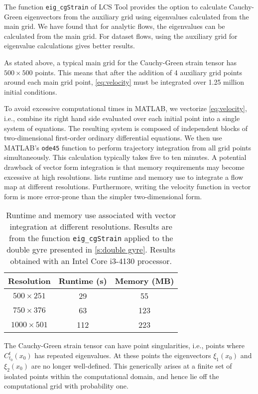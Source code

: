 \documentclass{article}
\begin{document}
The function \lstinline!eig_cgStrain! of LCS Tool provides the option to calculate Cauchy-Green eigenvectors from the auxiliary grid using eigenvalues calculated from the main grid.
We have found that for analytic flows, the eigenvalues can be calculated from the main grid.
For dataset flows, using the auxiliary grid for eigenvalue calculations gives better results.

As stated above, a typical main grid for the Cauchy-Green strain tensor has $500 \times 500$ points.
This means that after the addition of 4 auxiliary grid points around each main grid point, \cref{eq:velocity} must be integrated over 1.25 million initial conditions.

To avoid excessive computational times in MATLAB, we vectorize \cref{eq:velocity}, i.e., combine its right hand side evaluated over each initial point into a single system of equations. The resulting system is composed of independent blocks of two-dimensional first-order ordinary differential equations. We then use MATLAB's \lstinline!ode45! function to perform trajectory integration from all grid points simultaneously. This calculation typically takes five to ten minutes.
A potential drawback of vector form integration is that memory requirements may become excessive at high resolutions.
 lists runtime and memory use to integrate a flow map at different resolutions.
Furthermore, writing the velocity function in vector form is more error-prone than the simpler two-dimensional form.

\begin{table}
\begin{center}
\begin{tabular}{|c|c|c|}
\hline
Resolution & Runtime (s) & Memory (MB)\tabularnewline
\hline \hline
$500 \times 251$ & 29 & 55\tabularnewline
\hline
$750 \times 376$ & 63 & 123\tabularnewline
\hline
$1000 \times 501$ & 112 & 223\tabularnewline
\hline
\end{tabular}
\end{center}
\caption{
Runtime and memory use associated with vector integration at different resolutions.
Results are from the function \lstinline!eig_cgStrain! applied to the double gyre presented in \cref{s:double gyre}.
Results obtained with an Intel Core i3-4130 processor.
}
\label{t:vector integration memory}
\end{table}

The Cauchy-Green strain tensor can have point singularities, i.e., points where $C_{t_0}^t(x_0)$ has repeated eigenvalues.
At these points the eigenvectors $\xi_1(x_0)$ and $\xi_2(x_0)$ are no longer well-defined.
This generically arises at a finite set of isolated points within the computational domain\parencite{delmarcelle94}, and hence lie off the computational grid with probability one.
\end{document}
